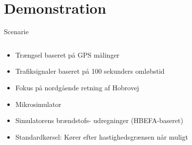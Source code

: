 \section{Demonstration}
\begin{frame}{Scenarie}
\begin{columns}
\begin{column}{0.6\textwidth}
\begin{itemize}
\item Trængsel baseret på GPS målinger
\item Trafiksignaler baseret på 100 sekunders omløbstid
\item Fokus på nordgående retning af Hobrovej
\item Mikrosimulator
\item Simulatorens brændstofs- udregninger (HBEFA-baseret)
\item Standardkørsel: Kører efter hastighedsgrænsen når muligt
\end{itemize}
\end{column}


\end{columns}
\end{frame}
